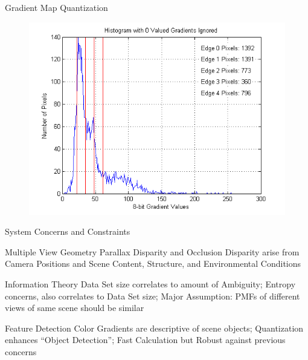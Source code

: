 \documentclass[serif]{beamer}
\begin{document}
\begin{frame}[c]{\sc Gradient Map Quantization}

\begin{figure}
\centering
\includegraphics[width=.95\columnwidth]{GradientHistogram}
\label{Flowchart}
\end{figure}

\end{frame}


\begin{frame}[t]{\sc System Concerns and Constraints}

\begin{block}{Multiple View Geometry}
Parallax Disparity and Occlusion Disparity arise from Camera Positions and Scene Content, Structure, and Environmental Conditions
\end{block}

\begin{block}{Information Theory}
Data Set size correlates to amount of Ambiguity; Entropy concerns, also correlates to Data Set size; Major Assumption: PMFs of different views of same scene should be similar
\end{block}


\begin{block}{Feature Detection}
Color Gradients are descriptive of scene objects; Quantization enhances ``Object Detection''; Fast Calculation but Robust against previous concerns
\end{block}

\end{frame}
\end{document}
